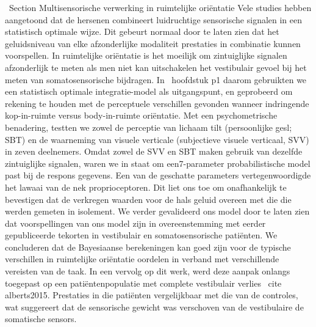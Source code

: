 \ Section {Multisensorische verwerking in ruimtelijke oriëntatie}
Vele studies hebben aangetoond dat de hersenen combineert luidruchtige sensorische signalen in een statistisch optimale wijze. Dit gebeurt normaal door te laten zien dat het geluidsniveau van elke afzonderlijke modaliteit prestaties in combinatie kunnen voorspellen. In ruimtelijke oriëntatie is het moeilijk om zintuiglijke signalen afzonderlijk te meten als men niet kan uitschakelen het vestibulair gevoel bij het meten van somatosensorische bijdragen. In \ hoofdstuk {p1} daarom gebruikten we een statistisch optimale integratie-model als uitgangspunt, en geprobeerd om rekening te houden met de perceptuele verschillen gevonden wanneer indringende kop-in-ruimte versus body-in-ruimte oriëntatie. Met een psychometrische benadering, testten we zowel de perceptie van lichaam tilt (persoonlijke gesl; SBT) en de waarneming van visuele verticale (subjectieve visuele verticaal, SVV) in zeven deelnemers. Omdat zowel de SVV en SBT maken gebruik van dezelfde zintuiglijke signalen, waren we in staat om een ​​7-parameter probabilistische model past bij de respons gegevens. Een van de geschatte parameters vertegenwoordigde het lawaai van de nek proprioceptoren. Dit liet ons toe om onafhankelijk te bevestigen dat de verkregen waarden voor de hals geluid overeen met die die werden gemeten in isolement. We verder gevalideerd ons model door te laten zien dat voorspellingen van ons model zijn in overeenstemming met eerder gepubliceerde tekorten in vestibulair en somatosensorische patiënten. We concluderen dat de Bayesiaanse berekeningen kan goed zijn voor de typische verschillen in ruimtelijke oriëntatie oordelen in verband met verschillende vereisten van de taak. In een vervolg op dit werk, werd deze aanpak onlangs toegepast op een patiëntenpopulatie met complete vestibulair verlies \ cite {alberts2015}. Prestaties in die patiënten vergelijkbaar met die van de controles, wat suggereert dat de sensorische gewicht was verschoven van de vestibulaire de somatische sensors.

